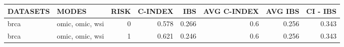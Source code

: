 \begin{tabular}{llrrrrrr}
\hline
 DATASETS   & MODES           &   RISK &   C-INDEX &   IBS &   AVG C-INDEX &   AVG IBS &   CI - IBS \\
\hline
 brca       & omic, omic, wsi &      0 &     0.578 & 0.266 &           0.6 &     0.256 &      0.343 \\
 brca       & omic, omic, wsi &      1 &     0.621 & 0.246 &           0.6 &     0.256 &      0.343 \\
\hline
\end{tabular}